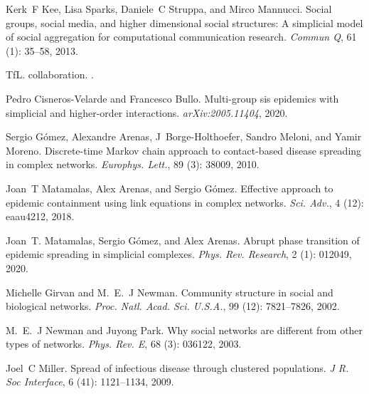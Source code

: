 Kerk~F Kee, Lisa Sparks, Daniele~C Struppa, and Mirco Mannucci.
\newblock Social groups, social media, and higher dimensional social
structures: {{A}} simplicial model of social aggregation for computational
communication research.
\newblock \emph{Commun Q}, 61 (1): 35--58, 2013.

{TfL}.
 collaboration.
.

Pedro Cisneros-Velarde and Francesco Bullo.
\newblock Multi-group sis epidemics with simplicial and higher-order
interactions.
\newblock \emph{arXiv:2005.11404}, 2020.

Sergio G{\'o}mez, Alexandre Arenas, J~{Borge-Holthoefer}, Sandro Meloni, and
Yamir Moreno.
\newblock Discrete-time {{Markov}} chain approach to contact-based disease
spreading in complex networks.
\newblock \emph{Europhys. Lett.}, 89 (3): 38009, 2010.

Joan~T Matamalas, Alex Arenas, and Sergio G{\'o}mez.
\newblock Effective approach to epidemic containment using link equations in
complex networks.
\newblock \emph{Sci. Adv.}, 4 (12): eaau4212, 2018.

Joan~T. Matamalas, Sergio G{\'o}mez, and Alex Arenas.
\newblock Abrupt phase transition of epidemic spreading in simplicial
complexes.
\newblock \emph{Phys. Rev. Research}, 2 (1): 012049, 2020.

Michelle Girvan and M.~E.~J Newman.
\newblock Community structure in social and biological networks.
\newblock \emph{Proc. Natl. Acad. Sci. U.S.A.}, 99 (12):
7821--7826, 2002.

M.~E.~J Newman and Juyong Park.
\newblock Why social networks are different from other types of networks.
\newblock \emph{Phys. Rev. E}, 68 (3): 036122, 2003.

Joel~C Miller.
\newblock Spread of infectious disease through clustered populations.
\newblock \emph{J R. Soc Interface}, 6 (41): 1121--1134,
2009{}.

